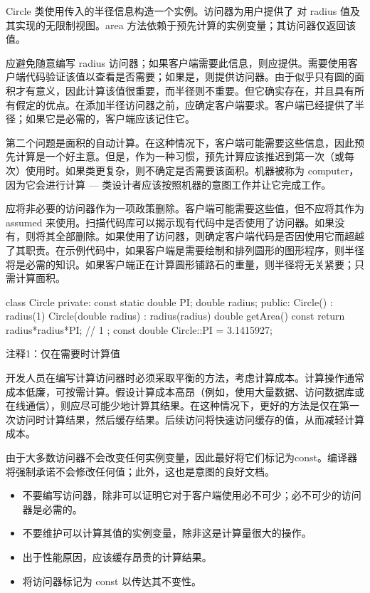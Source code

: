 Circle 类使用传入的半径信息构造一个实例。访问器为用户提供了 对 radius 值及其实现的无限制视图。area 方法依赖于预先计算的实例变量；其访问器仅返回该值。

应避免随意编写 radius 访问器；如果客户端需要此信息，则应提供。需要使用客户端代码验证该值以查看是否需要；如果是，则提供访问器。由于似乎只有圆的面积才有意义，因此计算该值很重要，而半径则不重要。但它确实存在，并且具有所有假定的优点。在添加半径访问器之前，应确定客户端要求。客户端已经提供了半径；如果它是必需的，客户端应该记住它。

第二个问题是面积的自动计算。在这种情况下，客户端可能需要这些信息，因此预先计算是一个好主意。但是，作为一种习惯，预先计算应该推迟到第一次（或每次）使用时。如果类更复杂，则不确定是否需要该面积。机器被称为 computer，因为它会进行计算 — 类设计者应该按照机器的意图工作并让它完成工作。


应将非必要的访问器作为一项政策删除。客户端可能需要这些值，但不应将其作为 assumed 来使用。扫描代码库可以揭示现有代码中是否使用了访问器。如果没有，则将其全部删除。如果使用了访问器，则确定客户端代码是否因使用它而超越了其职责。在示例代码中，如果客户端是需要绘制和排列圆形的图形程序，则半径将是必需的知识。如果客户端正在计算圆形铺路石的重量，则半径将无关紧要；只需计算面积。


\begin{cpp}
class Circle {
private:
  const static double PI;
  double radius;
public:
  Circle() : radius(1) {}
  Circle(double radius) : radius(radius) {}
  double getArea() const { return radius*radius*PI; } // 1
};
const double Circle::PI = 3.1415927;
\end{cpp}

{\footnotesize
注释1：仅在需要时计算值
}

开发人员在编写计算访问器时必须采取平衡的方法，考虑计算成本。计算操作通常成本低廉，可按需计算。假设计算成本高昂（例如，使用大量数据、访问数据库或在线通信），则应尽可能少地计算其结果。在这种情况下，更好的方法是仅在第一次访问时计算结果，然后缓存结果。后续访问将快速访问缓存的值，从而减轻计算成本。

由于大多数访问器不会改变任何实例变量，因此最好将它们标记为const。编译器将强制承诺不会修改任何值；此外，这也是意图的良好文档。


\begin{itemize}
\item
不要编写访问器，除非可以证明它对于客户端使用必不可少；必不可少的访问器是必需的。

\item
不要维护可以计算其值的实例变量，除非这是计算量很大的操作。

\item
出于性能原因，应该缓存昂贵的计算结果。

\item
将访问器标记为 const 以传达其不变性。
\end{itemize}











